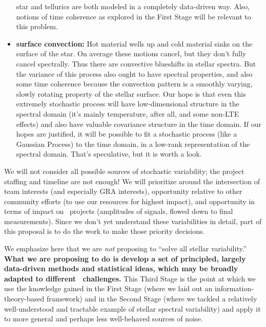 \documentclass[12pt, letterpaper]{article}
\begin{document}
\begin{itemize}
star and tellurics are both modeled in a completely data-driven way. 
Also, notions of time coherence as explored in the First Stage will be 
relevant to this problem.
\item
\textbf{surface convection:}
Hot material wells up and cold material sinks on the surface of the star.
On average these motions cancel, but they don't fully cancel spectrally.
Thus there are convective blueshifts in stellar spectra.
But the variance of this process also ought to have spectral
properties, and also some time coherence because the convection
pattern is a smoothly varying, slowly rotating property of the stellar
surface.
Our hope is that even this extremely stochastic process will have
low-dimensional structure in the spectral domain (it's mainly
temperature, after all, and some non-LTE effects) and also have
valuable covariance structure in the time domain.
If our hopes are justified, it will be possible to fit a stochastic
process (like a Gaussian Process) to the time domain, in a low-rank
representation of the spectral domain.
That's speculative, but it is worth a look.
\end{itemize}

\noindent
We will not consider all possible sources of stochastic variability;
the project staffing and timeline are not enough!
We will prioritize around the intersection of team interests (and
especially GRA interests), opportunity relative to other community efforts
(to use our resources for highest impact), and opportunity in terms of
impact on \EPRV\ projects (amplitudes of signals, flowed down to final measurements).
Since we don't yet understand these variabilities in detail, part of this
proposal is to do the work to make those priority decisions.

We emphasize here that we are \textit{not} proposing to ``solve
all stellar variability.'' \textbf{What we are proposing to do is develop a set of 
principled, largely data-driven methods and statistical ideas, which may be 
broadly adapted to different \EPRV\ challenges.} This Third Stage is the 
point at which we use the knowledge gained in the First Stage (where we 
laid out an information-theory-based framework) and in the Second Stage 
(where we tackled a relatively well-understood and tractable example 
of stellar spectral variability) and apply it to more general and perhaps
less well-behaved sources of noise.
\end{document}
